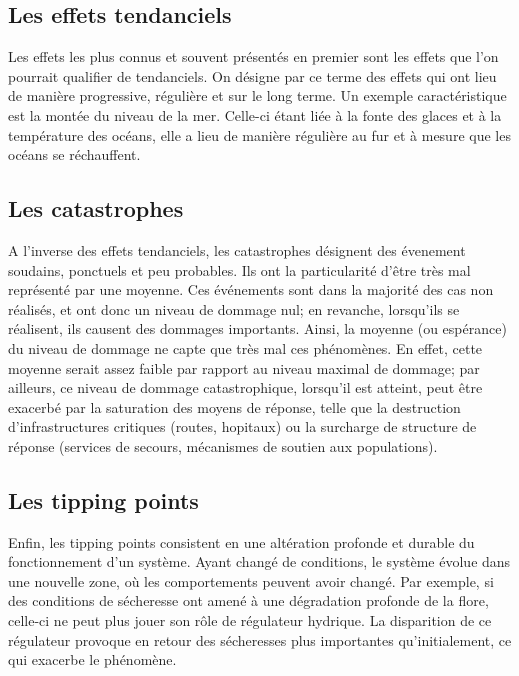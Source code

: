 \subsection{Les effets tendanciels}
\label{sect/1/1/1}


Les effets les plus connus et souvent présentés en premier sont les effets que l'on pourrait qualifier de tendanciels. On désigne par ce terme des effets qui ont lieu de manière progressive, régulière et sur le long terme. Un exemple caractéristique est la montée du niveau de la mer. Celle-ci étant liée à la fonte des glaces et à la température des océans, elle a lieu de manière régulière au fur et à mesure que les océans se réchauffent. 



\subsection{Les catastrophes}
\label{sect/1/1/2}

A l'inverse des effets tendanciels, les catastrophes désignent des évenement soudains, ponctuels et peu probables. Ils ont la particularité d'être très mal représenté par une moyenne. Ces événements sont dans la majorité des cas non réalisés, et ont donc un niveau de dommage nul; en revanche, lorsqu'ils se réalisent, ils causent des dommages importants. Ainsi, la moyenne (ou espérance) du niveau de dommage ne capte que très mal ces phénomènes. En effet, cette moyenne serait assez faible par rapport au niveau maximal de dommage; par ailleurs, ce niveau de dommage catastrophique, lorsqu'il est atteint, peut être exacerbé par la saturation des moyens de réponse, telle que la destruction d'infrastructures critiques (routes, hopitaux) ou la surcharge de structure de réponse (services de secours, mécanismes de soutien aux populations). 

\subsection{Les tipping points}
\label{sect/1/1/3}

Enfin, les tipping points consistent en une altération profonde et durable du fonctionnement d'un système. Ayant changé de conditions, le système évolue dans une nouvelle zone, où les comportements peuvent avoir changé. Par exemple, si des conditions de sécheresse ont amené à une dégradation profonde de la flore, celle-ci ne peut plus jouer son rôle de régulateur hydrique. La disparition de ce régulateur provoque en retour des sécheresses plus importantes qu'initialement, ce qui exacerbe le phénomène. 

